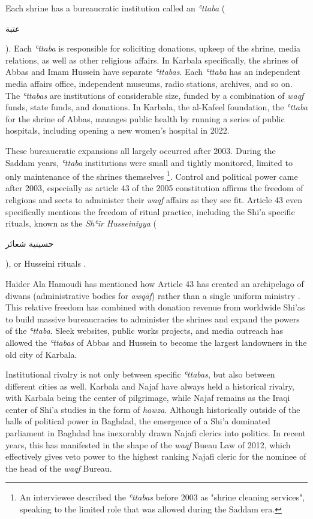 Each shrine has a bureaucratic institution called an \emph{ʿttaba} (\begin{Arabic}عتبة\end{Arabic}). Each \emph{ʿttaba} is responsible for soliciting donations, upkeep of the shrine, media relations, as well as other religious affairs. In Karbala specifically, the shrines of Abbas and Imam Hussein have separate \emph{ʿttabas}. Each \emph{ʿttaba} has an independent media affairs office, independent museums, radio stations, archives, and so on. The \emph{ʿttabas} are institutions of considerable size, funded by a combination of \emph{waqf} funds, state funds, and donations. In Karbala, the al-Kafeel foundation, the \emph{ʿttaba} for the shrine of Abbas, manages public health by running a series of public hospitals, including opening a new women's hospital in 2022. 

These bureaucratic expansions all largely occurred after 2003. During the Saddam years, \emph{ʿttaba} institutions were small and tightly monitored, limited to only maintenance of the shrines themselves \footnote{An interviewee described the \emph{ʿttabas} before 2003 as "shrine cleaning services", speaking to the limited role that was allowed during the Saddam era.}. Control and political power came after 2003, especially as article 43 of the 2005 constitution affirms the freedom of religions and sects to administer their \emph{waqf} affairs as they see fit. Article 43 even specifically mentions the freedom of ritual practice, including the Shi'a specific rituals, known as the \emph{Shʿir Husseiniyya} (\begin{Arabic}حسينية شعائر\end{Arabic}), or Husseini rituals \cite{jawad_iraqi_2003}. 

Haider Ala Hamoudi has mentioned how Article 43 has created an archipelago of diwans (administrative bodies for \emph{awqāf}) rather than a single uniform ministry \cite[220]{hamoudi_engagements_2020}. This relative freedom has combined with donation revenue from worldwide Shi'as to build massive bureaucracies to administer the shrines and expand the powers of the \emph{ʿttaba}. Sleek websites, public works projects, and media outreach has allowed the \emph{ʿttabas} of Abbas and Hussein to become the largest landowners in the old city of Karbala. 

Institutional rivalry is not only between specific \emph{ʿttabas}, but also between different cities as well. Karbala and Najaf have always held a historical rivalry, with Karbala being the center of pilgrimage, while Najaf remains as the Iraqi center of Shi'a studies in the form of \emph{hawza}. Although historically outside of the halls of political power in Baghdad, the emergence of a Shi'a dominated parliament in Baghdad has inexorably drawn Najafi clerics into politics. In recent years, this has manifested in the shape of the \emph{waqf} Bueau Law of 2012, which effectively gives veto power to the highest ranking Najafi cleric for the nominee of the head of the \emph{waqf} Bureau. 

